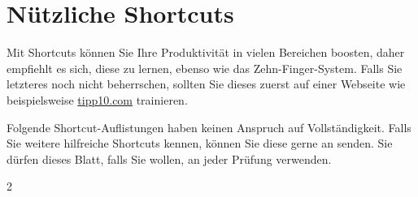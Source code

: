 \section{Nützliche Shortcuts}
\label{sec:shortcuts}
Mit Shortcuts können Sie Ihre Produktivität in vielen Bereichen boosten, daher empfiehlt es sich, diese zu lernen, ebenso wie das Zehn-Finger-System. Falls Sie letzteres noch nicht beherrschen, sollten Sie dieses zuerst auf einer Webseite wie beispielsweise \href{https://www.tipp10.com/de/}{tipp10.com} trainieren.

Folgende Shortcut-Auflistungen haben keinen Anspruch auf Vollständigkeit. Falls Sie weitere hilfreiche Shortcuts kennen, können Sie diese gerne an \href{mailto:\mainauthormail}{\mainauthor} senden. Sie dürfen dieses Blatt, falls Sie wollen, an jeder Prüfung verwenden.
\begin{multicols}{2}




\end{multicols}
